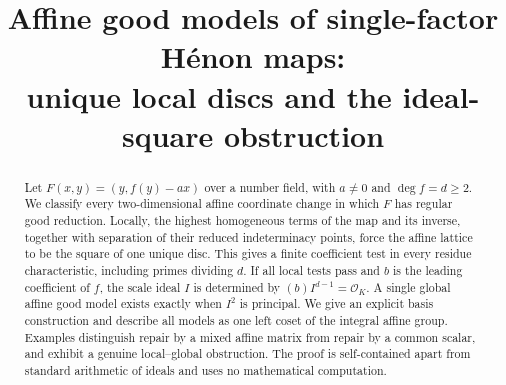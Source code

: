 \documentclass[11pt]{article}
\title{Affine good models of single-factor H\'enon maps:\\
unique local discs and the ideal-square obstruction}
\author{}
\date{}
\theoremstyle{definition}
\newcommand{\OO}{\mathcal O}
\numberwithin{equation}{section}
\begin{document}
\maketitle
\begin{abstract}
Let $F(x,y)=(y,f(y)-ax)$ over a number field, with $a\ne0$ and
$\deg f=d\ge2$. We classify every two-dimensional affine coordinate
change in which $F$ has regular good reduction. Locally, the highest
homogeneous terms of the map and its inverse, together with separation
of their reduced indeterminacy points, force the affine lattice to be
the square of one unique disc. This gives a finite coefficient test in
every residue characteristic, including primes dividing $d$. If all
local tests pass and $b$ is the leading coefficient of $f$, the scale
ideal $I$ is determined by $(b)I^{d-1}=\OO_K$. A single global affine
good model exists exactly when $I^2$ is principal. We give an explicit
basis construction and describe all models as one left coset of the
integral affine group. Examples distinguish repair by a mixed affine
matrix from repair by a common scalar, and exhibit a genuine
local--global obstruction. The proof is self-contained apart from
standard arithmetic of ideals and uses no mathematical computation.
\end{abstract}









\end{document}
